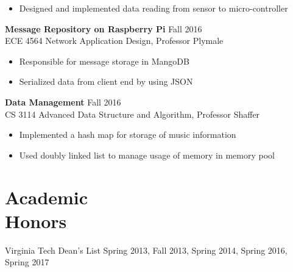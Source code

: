 \documentclass[margin]{res}
\begin{document}
\begin{resume}
\begin{itemize}
                 \item  Designed and implemented data reading from sensor to micro-controller

		 \end{itemize}

		{\bf  Message Repository on Raspberry Pi}                                     \hfill       Fall 2016 \\
		{ECE 4564 Network Application Design, Professor Plymale}
                \begin{itemize} \itemsep -2pt
                 \item  Responsible for message storage in MangoDB 
                
                 \item Serialized data from client end by using JSON

		 \end{itemize}

                  {\bf  Data Management}                             \hfill  Fall 2016 \\ 
                  {CS 3114 Advanced Data Structure and Algorithm, Professor Shaffer}  
                  \begin{itemize} \itemsep -2pt
                  \item Implemented a hash map for storage of music information
                  \item Used doubly linked list to manage usage of memory in memory pool
		 \end{itemize}

\section{Academic \\ Honors} 
Virginia Tech Dean's List Spring 2013, Fall 2013, Spring 2014, Spring 2016, Spring 2017
 


\end{resume} 
\end{document}
